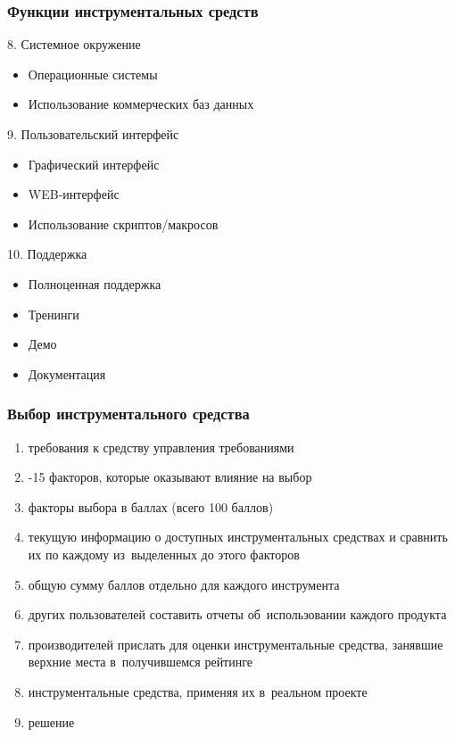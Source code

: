 \documentclass{../industrial-development}
\begin{document}
\begin{frame} \frametitle{Функции инструментальных средств}
8. Системное окружение
	\begin{itemize}
\item Операционные системы
\item Использование коммерческих баз данных
  	\end{itemize}
9. Пользовательский интерфейс
	\begin{itemize}
\item Графический интерфейс
\item WEB-интерфейс
\item Использование скриптов/макросов
  	\end{itemize}
10. Поддержка
	\begin{itemize}
\item Полноценная поддержка
\item Тренинги
\item Демо
\item Документация
  	\end{itemize}
\end{frame}



\begin{frame} \frametitle{Выбор инструментального средства}
	\begin{enumerate}
\item {} требования к средству управления требованиями
\item {}-15 факторов, которые оказывают влияние на выбор
\item {} факторы выбора в баллах (всего 100 баллов)
\item {} текущую информацию о доступных инструментальных средствах и сравнить их по каждому из~выделенных до этого факторов
\item {} общую сумму баллов отдельно для каждого инструмента
\item {} других пользователей составить отчеты об~использовании каждого продукта
\item {} производителей прислать для оценки инструментальные средства, занявшие верхние места в~получившемся рейтинге
\item {} инструментальные средства, применяя их в~реальном проекте
\item {} решение
  	\end{enumerate}
\end{frame}
\end{document}
